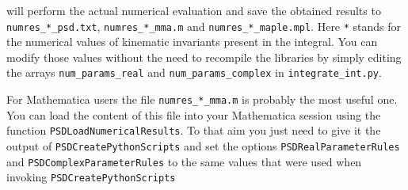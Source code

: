 \documentclass[../FeynHelpersManual.tex]{subfiles}
\begin{document}
will perform the actual numerical evaluation and save the obtained
results to \texttt{numres_*_psd.txt}, \texttt{numres_*_mma.m} and
\texttt{numres_*_maple.mpl}. Here \texttt{*} stands for the numerical
values of kinematic invariants present in the integral. You can modify
those values without the need to recompile the libraries by simply
editing the arrays \texttt{num_params_real} and
\texttt{num_params_complex} in \texttt{integrate_int.py}.

For Mathematica users the file \texttt{numres_*_mma.m} is probably the
most useful one. You can load the content of this file into your
Mathematica session using the function \texttt{PSDLoadNumericalResults}.
To that aim you just need to give it the output of
\texttt{PSDCreatePythonScripts} and set the options
\texttt{PSDRealParameterRules} and \texttt{PSDComplexParameterRules} to
the same values that were used when invoking
\texttt{PSDCreatePythonScripts}

\begin{Shaded}
\begin{Highlighting}[]
\OperatorTok{[}\OperatorTok{,}\OtherTok{{-}\textgreater{}} \OperatorTok{\{}\OtherTok{{-}\textgreater{}} \OperatorTok{,}\OtherTok{{-}\textgreater{}} \OperatorTok{,}\OtherTok{{-}\textgreater{}} \OperatorTok{\}]}
\end{Highlighting}
\end{Shaded}
\end{document}
